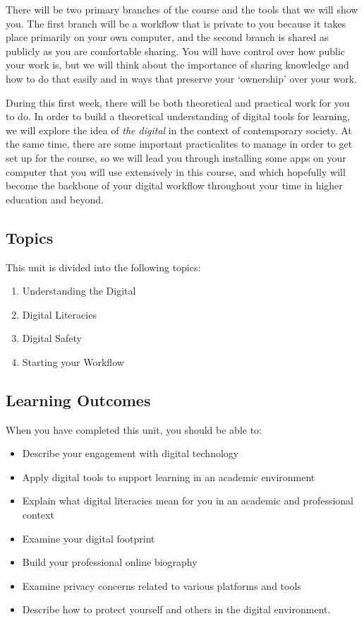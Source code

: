\documentclass[
]{book}
\providecommand{\tightlist}{%
  \setlength{\itemsep}{0pt}\setlength{\parskip}{0pt}}
\theoremstyle{definition}
\theoremstyle{definition}
\theoremstyle{definition}
\theoremstyle{definition}
\theoremstyle{remark}
\begin{document}
There will be two primary branches of the course and the tools that we will show you. The first branch will be a workflow that is private to you because it takes place primarily on your own computer, and the second branch is shared as publicly as you are comfortable sharing. You will have control over how public your work is, but we will think about the importance of sharing knowledge and how to do that easily and in ways that preserve your `ownership' over your work.

During this first week, there will be both theoretical and practical work for you to do. In order to build a theoretical understanding of digital tools for learning, we will explore the idea of \emph{the digital} in the context of contemporary society. At the same time, there are some important practicalites to manage in order to get set up for the course, so we will lead you through installing some apps on your computer that you will use extensively in this course, and which hopefully will become the backbone of your digital workflow throughout your time in higher education and beyond.

\hypertarget{topics}{%
\subsection*{Topics}\label{topics}}

This unit is divided into the following topics:

\begin{enumerate}
\def\labelenumi{\arabic{enumi}.}
\tightlist
\item
  Understanding the Digital
\item
  Digital Literacies
\item
  Digital Safety
\item
  Starting your Workflow
\end{enumerate}

\hypertarget{learning-outcomes}{%
\subsection*{Learning Outcomes}\label{learning-outcomes}}

When you have completed this unit, you should be able to:

\begin{itemize}
\tightlist
\item
  Describe your engagement with digital technology
\item
  Apply digital tools to support learning in an academic environment
\item
  Explain what digital literacies mean for you in an academic and professional context
\item
  Examine your digital footprint
\item
  Build your professional online biography
\item
  Examine privacy concerns related to various platforms and tools
\item
  Describe how to protect yourself and others in the digital environment.
\end{itemize}
\end{document}
